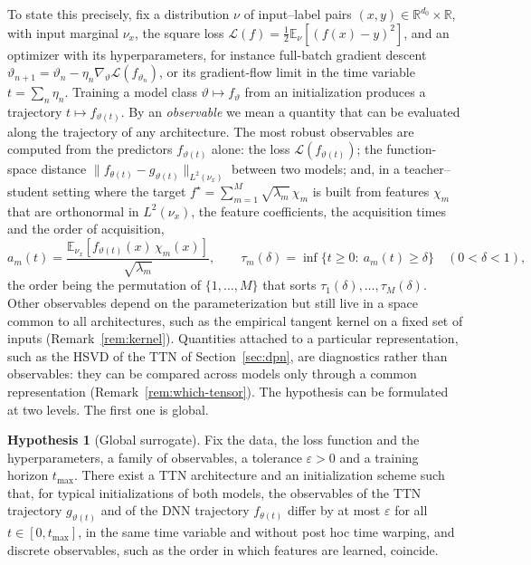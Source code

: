 \documentclass[11pt]{article}
\newcommand{\R}{\mathbb{R}}
\newcommand{\E}{\mathbb{E}}
\newcommand{\norm}[1]{\lVert #1\rVert}
\theoremstyle{definition}
\newtheorem{hypothesis}[theorem]{Hypothesis}
\numberwithin{equation}{section}
\begin{document}
To state this precisely, fix a distribution $\nu$ of input--label pairs $(x,y)\in\R^{d_0}\times\R$, with input marginal $\nu_x$, the square loss $\mathcal L(f)=\tfrac12\E_\nu[(f(x)-y)^2]$, and an optimizer with its hyperparameters, for instance full-batch gradient descent $\vartheta_{n+1}=\vartheta_n-\eta_n\nabla_\vartheta\mathcal L(f_{\vartheta_n})$, or its gradient-flow limit in the time variable $t=\sum_n\eta_n$. Training a model class $\vartheta\mapsto f_\vartheta$ from an initialization produces a trajectory $t\mapsto f_{\vartheta(t)}$. By an \emph{observable} we mean a quantity that can be evaluated along the trajectory of any architecture. The most robust observables are computed from the predictors $f_{\vartheta(t)}$ alone: the loss $\mathcal L(f_{\vartheta(t)})$; the function-space distance $\norm{f_{\theta(t)}-g_{\vartheta(t)}}_{L^2(\nu_x)}$ between two models; and, in a teacher--student setting where the target $f^\star=\sum_{m=1}^M\sqrt{\lambda_m}\,\chi_m$ is built from features $\chi_m$ that are orthonormal in $L^2(\nu_x)$, the feature coefficients, the acquisition times and the order of acquisition,
\begin{equation}\label{eq:acquisition}
a_m(t)=\frac{\E_{\nu_x}[f_{\vartheta(t)}(x)\,\chi_m(x)]}{\sqrt{\lambda_m}},\qquad
\tau_m(\delta)=\inf\{t\ge0:\ a_m(t)\ge\delta\}\quad(0<\delta<1),
\end{equation}
the order being the permutation of $\{1,\dots,M\}$ that sorts $\tau_1(\delta),\dots,\tau_M(\delta)$. Other observables depend on the parameterization but still live in a space common to all architectures, such as the empirical tangent kernel on a fixed set of inputs (Remark~\ref{rem:kernel}). Quantities attached to a particular representation, such as the HSVD of the TTN of Section~\ref{sec:dpn}, are diagnostics rather than observables: they can be compared across models only through a common representation (Remark~\ref{rem:which-tensor}). The hypothesis can be formulated at two levels. The first one is global.

\begin{hypothesis}[Global surrogate]\label{hyp:global}
Fix the data, the loss function and the hyperparameters, a family of observables, a tolerance $\varepsilon>0$ and a training horizon $t_{\max}$. There exist a TTN architecture and an initialization scheme such that, for typical initializations of both models, the observables of the TTN trajectory $g_{\vartheta(t)}$ and of the DNN trajectory $f_{\theta(t)}$ differ by at most $\varepsilon$ for all $t\in[0,t_{\max}]$, in the same time variable and without post hoc time warping, and discrete observables, such as the order in which features are learned, coincide.
\end{hypothesis}
\end{document}

